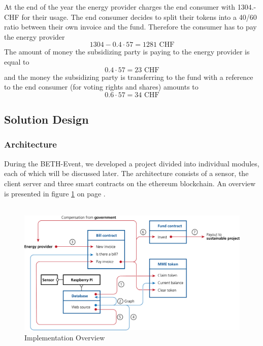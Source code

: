 \documentclass[11pt]{article}
\begin{document}
\noindent
At the end of the year the energy provider charges the end consumer with 1304.- CHF for their usage. The end consumer decides to split their tokens into a 40/60 ratio between their own invoice and the fund. Therefore the consumer has to pay the energy provider
\begin{equation}
1304-0.4\cdot57=1281  \textrm{ CHF}
\end{equation}
The amount of money the subsidizing party is paying to the energy provider is equal to
\begin{equation}
0.4\cdot57=23 \textrm{ CHF}
\end{equation}
and the money the subsidizing party is transferring to the fund with a reference to the end consumer (for voting rights and shares) amounts to
\begin{equation}
0.6\cdot57=34 \textrm{ CHF}
\end{equation}

\subsection{Solution Design}
\subsubsection{Architecture}
During the BETH-Event, we developed a project divided into individual modules, each of which will be discussed later. The architecture consists of a sensor, the client server and three smart contracts on the ethereum blockchain. An overview is presented in figure \ref{img_impl} on page \pageref{img_impl}.\\\\
\begin{figure}[ht]
	\begin{center}
		\includegraphics[scale=1.5]{../presentation/implementation.png}
		\caption{Implementation Overview}
		\label{img_impl}
	\end{center}
\end{figure}
\end{document}
